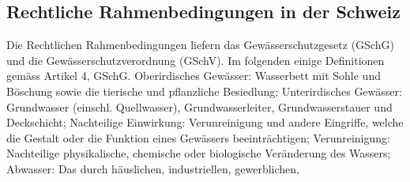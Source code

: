 \documentclass[9pt, openright=false]{scrartcl}
\begin{document}
\subsection{Rechtliche Rahmenbedingungen in der Schweiz}
Die Rechtlichen Rahmenbedingungen liefern das Gewässerschutzgesetz (GSchG) und die Gewässerschutzverordnung (GSchV). Im folgenden einige Definitionen gemäss Artikel 4, GSchG. Oberirdisches Gewässer: Wasserbett mit Sohle und Böschung sowie die tierische und pflanzliche Besiedlung; Unterirdisches Gewässer: Grundwasser (einschl. Quellwasser), Grundwasserleiter, Grundwasserstauer und Deckschicht; Nachteilige Einwirkung: Verunreinigung und andere Eingriffe, welche die Gestalt oder die Funktion eines Gewässers beeinträchtigen; Verunreinigung: Nachteilige physikalische, chemische oder biologische Veränderung des Wassers; Abwasser: Das durch häuslichen, industriellen, gewerblichen,
\end{document}
